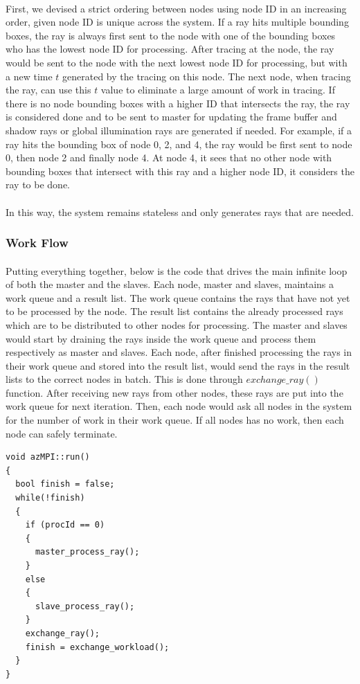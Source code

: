 \documentclass[a4paper, oneside, 10pt]{article}
\begin{document}
\paragraph{} First, we devised a strict ordering between nodes using node ID in an increasing order, given node ID is unique across the system. If a ray hits multiple bounding boxes, the ray is always first sent to the node with one of the bounding boxes who has the lowest node ID for processing.  After tracing at the node, the ray would be sent to the node with the next lowest node ID for processing, but with a new time $t$ generated by the tracing on this node. The next node, when tracing the ray, can use this $t$ value to eliminate a large amount of work in tracing. If there is no node bounding boxes with a higher ID that intersects the ray, the ray is considered done and to be sent to master for updating the frame buffer and shadow rays or global illumination rays are generated if needed.  For example, if a ray hits the bounding box of node 0, 2, and 4, the ray would be first sent to node 0, then node 2 and finally node 4. At node 4, it sees that no other node with bounding boxes that intersect with this ray and a higher node ID, it considers the ray to be done.
\paragraph{} In this way, the system remains stateless and only generates rays that are needed. 
\subsubsection{Work Flow}
\paragraph{} Putting everything together, below is the code that drives the main infinite loop of both the master and the slaves. Each node, master and slaves, maintains a work queue and a result list. The work queue contains the rays that have not yet to be processed by the node. The result list contains the already processed rays which are to be distributed to other nodes for processing. The master and slaves would start by draining the rays inside the work queue and process them respectively as master and slaves.  Each node, after finished processing the rays in their work queue and stored into the result list, would send the rays in the result lists to the correct nodes in batch. This is done through $exchange\_ray()$ function. After receiving new rays from other nodes, these rays are put into the work queue for next iteration. Then, each node would ask all nodes in the system for the number of work in their work queue. If all nodes has no work, then each node can safely terminate.
\lstset{language=C++} 
\begin{lstlisting}[frame=single] 
void azMPI::run()
{
  bool finish = false;
  while(!finish)
  {
    if (procId == 0)
    {
      master_process_ray();
    }
    else
    {
      slave_process_ray();
    }
    exchange_ray();
    finish = exchange_workload();
  }
}

\end{lstlisting}
\end{document}
